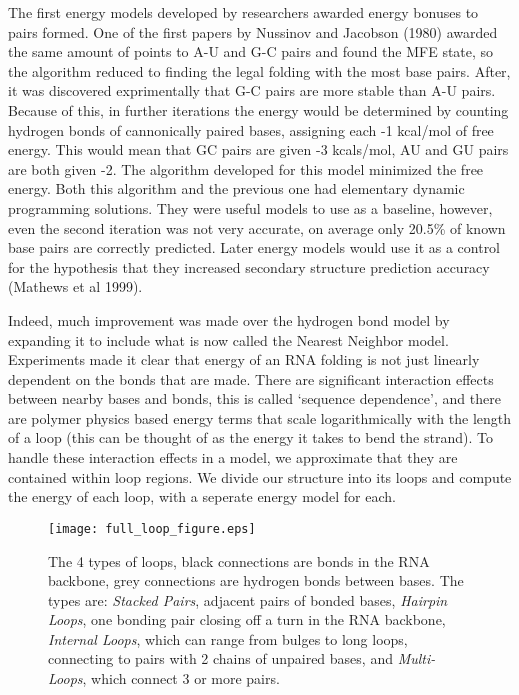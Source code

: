  The first energy models developed by researchers awarded energy
 bonuses to pairs formed. One of the first papers by Nussinov and
 Jacobson (1980) awarded the same amount of points to A-U and G-C
 pairs and found the MFE state, so the algorithm reduced to finding
 the legal folding with the most base pairs. After, it was discovered
 exprimentally that G-C pairs are more stable than A-U pairs. Because
 of this, in further iterations the energy would be determined by
 counting hydrogen bonds of cannonically paired bases, assigning each
 -1 kcal/mol of free energy. This would mean that GC pairs are given
 -3 kcals/mol, AU and GU pairs are both given -2. The algorithm
 developed for this model minimized the free energy. Both this
 algorithm and the previous one had elementary dynamic programming
 solutions. They were useful models to use as a baseline, however,
 even the second iteration was not very accurate, on average only
 20.5\% of known base pairs are correctly predicted. Later energy
 models would use it as a control for the hypothesis that they
 increased secondary structure prediction accuracy (Mathews et al
 1999).

Indeed, much improvement was made over the hydrogen bond model by
expanding it to include what is now called the Nearest Neighbor
model. Experiments made it clear that energy of an RNA folding is not
just linearly dependent on the bonds that are made. There are
significant interaction effects between nearby bases and bonds, this
is called `sequence dependence', and there are polymer physics based
energy terms that scale logarithmically with the length of a loop
(this can be thought of as the energy it takes to bend the strand). To
handle these interaction effects in a model, we approximate that they
are contained within loop regions. We divide our structure into its
loops and compute the energy of each loop, with a seperate energy
model for each.

\begin{figure}[t]
\texttt{[image: full\_loop\_figure.eps]}
\caption{The 4 types of loops, black connections are bonds in the RNA
  backbone, grey connections are hydrogen bonds between bases. The
  types are: \textit{Stacked Pairs}, adjacent pairs of bonded bases,
  \textit{Hairpin Loops}, one bonding pair closing off a turn in the
  RNA backbone, \textit{Internal Loops}, which can range from bulges
  to long loops, connecting to pairs with 2 chains of unpaired bases,
  and \textit{Multi-Loops}, which  connect 3 or more pairs.}
\label{fig:loopFigure}
\end{figure}

